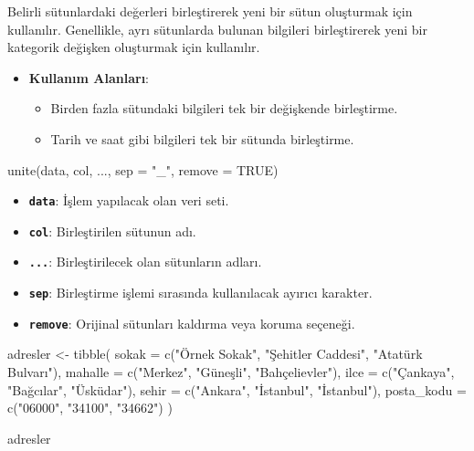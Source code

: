 \documentclass[
  letterpaper,
  DIV=11,
  numbers=noendperiod]{scrreprt}
\newenvironment{Shaded}{\begin{snugshade}}{\end{snugshade}}
\newcommand{\AttributeTok}[1]{\textcolor[rgb]{0.40,0.45,0.13}{#1}}
\newcommand{\ConstantTok}[1]{\textcolor[rgb]{0.56,0.35,0.01}{#1}}
\newcommand{\FunctionTok}[1]{\textcolor[rgb]{0.28,0.35,0.67}{#1}}
\newcommand{\NormalTok}[1]{\textcolor[rgb]{0.00,0.23,0.31}{#1}}
\newcommand{\OtherTok}[1]{\textcolor[rgb]{0.00,0.23,0.31}{#1}}
\newcommand{\StringTok}[1]{\textcolor[rgb]{0.13,0.47,0.30}{#1}}
\begin{document}

Belirli sütunlardaki değerleri birleştirerek yeni bir sütun oluşturmak
için kullanılır. Genellikle, ayrı sütunlarda bulunan bilgileri
birleştirerek yeni bir kategorik değişken oluşturmak için kullanılır.

\begin{itemize}
\item
  \textbf{Kullanım Alanları}:

  \begin{itemize}
  \item
    Birden fazla sütundaki bilgileri tek bir değişkende birleştirme.
  \item
    Tarih ve saat gibi bilgileri tek bir sütunda birleştirme.
  \end{itemize}
\end{itemize}

\begin{Shaded}
\begin{Highlighting}[]
\FunctionTok{unite}\NormalTok{(data, col, ..., }\AttributeTok{sep =} \StringTok{"\_"}\NormalTok{, }\AttributeTok{remove =} \ConstantTok{TRUE}\NormalTok{)}
\end{Highlighting}
\end{Shaded}

\begin{itemize}
\item
  \textbf{\texttt{data}}: İşlem yapılacak olan veri seti.
\item
  \textbf{\texttt{col}}: Birleştirilen sütunun adı.
\item
  \textbf{\texttt{...}}: Birleştirilecek olan sütunların adları.
\item
  \textbf{\texttt{sep}}: Birleştirme işlemi sırasında kullanılacak
  ayırıcı karakter.
\item
  \textbf{\texttt{remove}}: Orijinal sütunları kaldırma veya koruma
  seçeneği.
\end{itemize}

\begin{Shaded}
\begin{Highlighting}[]
\NormalTok{adresler }\OtherTok{\textless{}{-}} \FunctionTok{tibble}\NormalTok{(}
  \AttributeTok{sokak =} \FunctionTok{c}\NormalTok{(}\StringTok{"Örnek Sokak"}\NormalTok{, }\StringTok{"Şehitler Caddesi"}\NormalTok{, }\StringTok{"Atatürk Bulvarı"}\NormalTok{),}
  \AttributeTok{mahalle =} \FunctionTok{c}\NormalTok{(}\StringTok{"Merkez"}\NormalTok{, }\StringTok{"Güneşli"}\NormalTok{, }\StringTok{"Bahçelievler"}\NormalTok{),}
  \AttributeTok{ilce =} \FunctionTok{c}\NormalTok{(}\StringTok{"Çankaya"}\NormalTok{, }\StringTok{"Bağcılar"}\NormalTok{, }\StringTok{"Üsküdar"}\NormalTok{),}
  \AttributeTok{sehir =} \FunctionTok{c}\NormalTok{(}\StringTok{"Ankara"}\NormalTok{, }\StringTok{"İstanbul"}\NormalTok{, }\StringTok{"İstanbul"}\NormalTok{),}
  \AttributeTok{posta\_kodu =} \FunctionTok{c}\NormalTok{(}\StringTok{"06000"}\NormalTok{, }\StringTok{"34100"}\NormalTok{, }\StringTok{"34662"}\NormalTok{)}
\NormalTok{)}

\NormalTok{adresler}
\end{Highlighting}
\end{Shaded}
\end{document}
